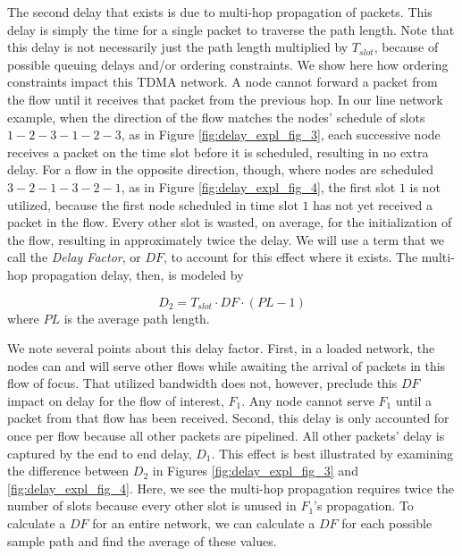 The second delay that exists is due to multi-hop propagation of packets.  This delay is simply the time for a single packet to traverse the path length.  Note that this delay is not necessarily just the path length multiplied by $T_{slot}$, because of possible queuing delays and/or ordering constraints.  We show here how ordering constraints impact this TDMA network.  A node cannot forward a packet from the flow until it receives that packet from the previous hop.  In our line network example, when the direction of the flow matches the nodes' schedule of slots $1-2-3-1-2-3$, as in Figure \ref{fig:delay_expl_fig_3}, each successive node receives a packet on the time slot before it is scheduled, resulting in no extra delay.  For a flow in the opposite direction, though, where nodes are scheduled $3-2-1-3-2-1$, as in Figure \ref{fig:delay_expl_fig_4}, the first slot $1$ is not utilized, because the first node scheduled in time slot $1$ has not yet received a packet in the flow.  Every other slot is wasted, on average, for the initialization of the flow, resulting in approximately twice the delay.  We will use a term that we call the \emph{Delay Factor}, or $DF$, to account for this effect where it exists.  
The multi-hop propagation delay, then, is modeled by

\begin{equation}
	D_2 = T_{slot} \cdot DF \cdot (PL - 1)
\end{equation}
where $PL$ is the average path length.

We note several points about this delay factor.  First, in a loaded network, the nodes can and will serve other flows while awaiting the arrival of packets in this flow of focus.  That utilized bandwidth does not, however, preclude this $DF$ impact on delay for the flow of interest, $F_1$.  Any node cannot serve $F_1$ until a packet from that flow has been received.  Second, this delay is only accounted for once per flow because all other packets are pipelined.  All other packets' delay is captured by the end to end delay, $D_1$.  This effect is best illustrated by examining the difference between $D_2$ in Figures \ref{fig:delay_expl_fig_3} and \ref{fig:delay_expl_fig_4}.  Here, we see the multi-hop propagation requires twice the number of slots because every other slot is unused in $F_1$'s propagation.  
To calculate a $DF$ for an entire network, we can calculate a $DF$ for each possible sample path and find the average of these values.  %

